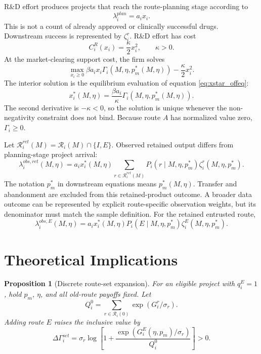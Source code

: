 \documentclass[12pt]{article}
\newtheorem{proposition}{Proposition}
\newcommand{\1}{\mathbf{1}}
\newcommand{\calR}{\mathcal{R}}
\begin{document}
R\&D effort produces projects that reach the route-planning stage according to
\begin{equation}
    \lambda_i^{plan}=a_i x_i.
    \label{eq:planning_arrival}
\end{equation}
This is not a count of already approved or clinically successful drugs. Downstream success is represented by $\zeta_i^r$. R\&D effort has cost
\begin{equation}
    C_i^R(x_i)=\frac{\kappa}{2}x_i^2,\qquad \kappa>0.
    \label{eq:rd_cost}
\end{equation}
At the market-clearing support cost, the firm solves
\[
    \max_{x_i\ge0}
    \beta a_i x_i\Gamma_i(M,\eta,p_m^*(M,\eta))-\frac{\kappa}{2}x_i^2 .
\]
The interior solution is the equilibrium evaluation of equation \eqref{eq:xstar_offeq}:
\begin{equation}
    x_i^*(M,\eta)
    =\frac{\beta a_i}{\kappa}\Gamma_i(M,\eta,p_m^*(M,\eta)).
    \label{eq:xstar}
\end{equation}
The second derivative is $-\kappa<0$, so the solution is unique whenever the non-negativity constraint does not bind. Because route $A$ has normalized value zero, $\Gamma_i\ge0$.

Let $\calR_i^{ret}(M)=\calR_i(M)\cap\{I,E\}$. Observed retained output differs from planning-stage project arrival:
\begin{equation}
    \lambda_i^{obs,ret}(M,\eta)
    =
    a_i x_i^*(M,\eta)
    \sum_{r\in\calR_i^{ret}(M)}
    P_i(r\mid M,\eta,p_m^*)\zeta_i^r(M,\eta,p_m^*).
    \label{eq:lambda_obs}
\end{equation}
The notation $p_m^*$ in downstream equations means $p_m^*(M,\eta)$. Transfer and abandonment are excluded from this retained-product outcome. A broader data outcome can be represented by explicit route-specific observation weights, but its denominator must match the sample definition.
For the retained entrusted route,
\begin{equation}
    \lambda_i^{obs,E}(M,\eta)
    =
    a_i x_i^*(M,\eta)
    P_i(E\mid M,\eta,p_m^*)\zeta_i^E(M,\eta,p_m^*).
    \label{eq:lambda_obs_E}
\end{equation}

\section{Theoretical Implications}

\begin{proposition}[Discrete route-set expansion]
\label{prop:set_expansion}
For an eligible project with $q_i^E=1$, hold $p_m$, $\eta$, and all old-route payoffs fixed. Let
\[
    Q_i^0=\sum_{r\in\calR_i(0)}\exp(G_i^r/\sigma_r).
\]
Adding route $E$ raises the inclusive value by
\begin{equation}
    \Delta\Gamma_i^{set}
    =\sigma_r\log\left[
    1+\frac{\exp(G_i^E(\eta,p_m)/\sigma_r)}{Q_i^0}
    \right]>0.
    \label{eq:set_expansion}
\end{equation}
\end{proposition}
\end{document}
